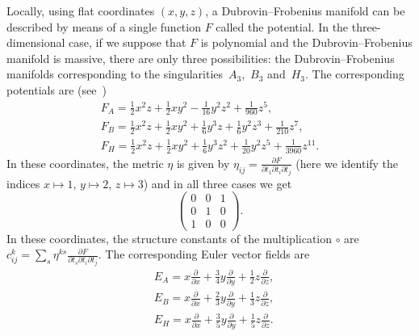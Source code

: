 \documentclass[pdftex]{sigma}
\numberwithin{equation}{section}
\begin{document}
Locally, using flat coordinates $(x,y,z)$, a Dubrovin--Frobenius manifold can be described by means of a single function $F$ called the potential. In the three-dimensional case, if we suppose that $F$ is polynomial and the Dubrovin--Frobenius manifold is massive, there are only three possibilities: the Dubrovin--Frobenius manifolds corresponding to the singularities~$A_{3}$,~$B_{3}$ and~$H_{3}$. The corresponding potentials are (see~\cite[Chapter~1, Example~1.4]{Dubrovin:1994hc})
\begin{gather*}
 F_{A}=\frac{1}{2}x^{2}z+\frac{1}{2}xy^{2}-\frac{1}{16}y^{2}z^{2}+\frac{1}{960}z^{5}, \\
 F_{B}=\frac{1}{2}x^{2}z+\frac{1}{2}xy^{2}+\frac{1}{6}y^{3}z+\frac{1}{6}y^{2}z^{3}+\frac{1}{210}z^{7}, \\
 F_{H}=\frac{1}{2}x^{2}z+\frac{1}{2}xy^{2}+\frac{1}{6}y^{3}z^{2}+\frac{1}{20}y^{2}z^{5}+\frac{1}{3960}z^{11}.
 \end{gather*}
In these coordinates, the metric $\eta$ is given by $\eta_{ij}=\tfrac{\partial F}{\partial t_{1}\partial t_{i}\partial t_{j}}$ (here we identify the indices $x\mapsto 1$, $y\mapsto 2$, $z\mapsto 3$) and in all three cases we get
\begin{equation*}
 \begin{pmatrix}
 0&0&1\\
 0&1&0\\
 1&0&0
 \end{pmatrix}.
\end{equation*}
In these coordinates, the structure constants of the multiplication $\circ$ are $c^{k}_{ij}=\sum_{s}\eta^{ks}\tfrac{\partial F}{\partial t_{s}\partial t_{i}\partial t_{j}}$. The corresponding Euler vector fields are
\begin{align*}
 & E_{A}=x\frac{\partial}{\partial x}+\frac{3}{4}y\frac{\partial}{\partial y}+\frac{1}{2}z\frac{\partial}{\partial z},\\
 & E_{B}=x\frac{\partial}{\partial x}+\frac{2}{3}y\frac{\partial}{\partial y}+\frac{1}{3}z\frac{\partial}{\partial z},\\
 & E_{H}=x\frac{\partial}{\partial x}+\frac{3}{5}y\frac{\partial}{\partial y}+\frac{1}{5}z\frac{\partial}{\partial z}.
\end{align*}
\end{document}
